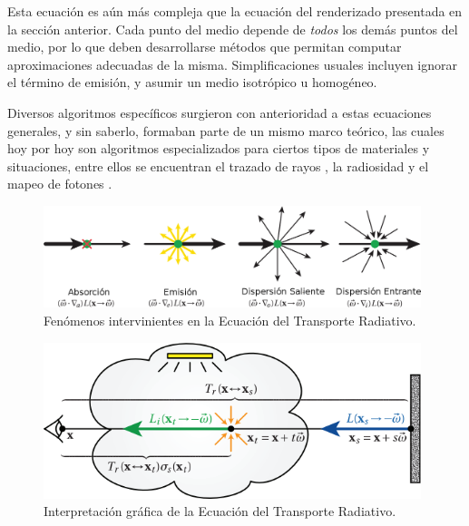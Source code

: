 Esta ecuación es aún más compleja que la ecuación del renderizado presentada en la sección anterior.
Cada punto del medio depende de {\em todos} los demás puntos del medio, por lo que deben desarrollarse métodos que permitan computar aproximaciones adecuadas de la misma.
Simplificaciones usuales incluyen ignorar el término de emisión, y asumir un medio isotrópico u homogéneo.

Diversos algoritmos específicos surgieron con anterioridad a estas ecuaciones generales, y sin saberlo, formaban parte de un mismo marco teórico, las cuales hoy por hoy son algoritmos especializados para ciertos tipos de materiales y situaciones, entre ellos se encuentran el trazado de rayos \cite{}, la radiosidad \cite{} y el mapeo de fotones \cite{}.



\begin{figure}
\center
\includegraphics[width=11cm]{figures/fenomenosrte}
\caption{Fenómenos intervinientes en la Ecuación del Transporte Radiativo.}
\label{fg:fenomenosrte}
\end{figure}

\begin{figure}
\center
\includegraphics[width=11cm]{figures/rte}
\caption{Interpretación gráfica de la Ecuación del Transporte Radiativo.}
\label{fg:rte}
\end{figure}


